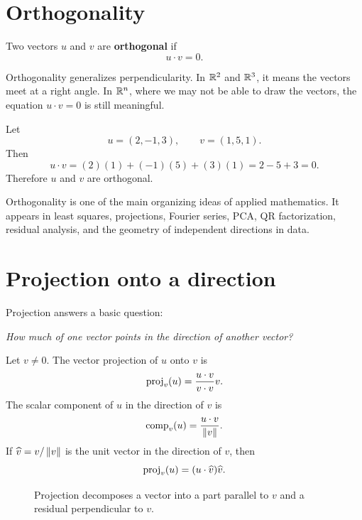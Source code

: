 \section{Orthogonality}

\begin{definitionbox}
Two vectors $u$ and $v$ are \textbf{orthogonal} if
\[
  u\cdot v=0.
\]
\end{definitionbox}

Orthogonality generalizes perpendicularity. In $\mathbb{R}^2$ and $\mathbb{R}^3$, it means the vectors meet at a right angle. In $\mathbb{R}^n$, where we may not be able to draw the vectors, the equation $u\cdot v=0$ is still meaningful.

\begin{examplebox}[title={Example 3.6: Checking orthogonality}]
Let
\[
  u=(2,-1,3), \qquad v=(1,5,1).
\]
Then
\[
  u\cdot v=(2)(1)+(-1)(5)+(3)(1)=2-5+3=0.
\]
Therefore $u$ and $v$ are orthogonal.
\end{examplebox}

\begin{bridgebox}
Orthogonality is one of the main organizing ideas of applied mathematics. It appears in least squares, projections, Fourier series, PCA, QR factorization, residual analysis, and the geometry of independent directions in data.
\end{bridgebox}

\section{Projection onto a direction}

Projection answers a basic question:

\begin{center}
\large\emph{How much of one vector points in the direction of another vector?}
\end{center}

Let $v\ne 0$. The vector projection of $u$ onto $v$ is
\[
  \operatorname{proj}_v(u)=\frac{u\cdot v}{v\cdot v}v.
\]
The scalar component of $u$ in the direction of $v$ is
\[
  \operatorname{comp}_v(u)=\frac{u\cdot v}{\left\lVert v\right\rVert}.
\]
If $\widehat v=v/\left\lVert v\right\rVert$ is the unit vector in the direction of $v$, then
\[
  \operatorname{proj}_v(u)=(u\cdot \widehat v)\widehat v.
\]

\begin{figure}[H]
\centering
{}
\caption{Projection decomposes a vector into a part parallel to $v$ and a residual perpendicular to $v$.}
\end{figure}

